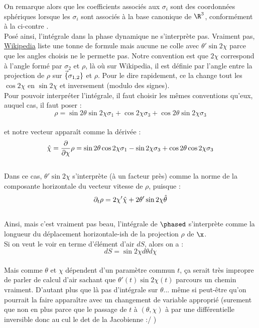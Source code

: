 On remarque alors que les coefficients associés aux $\sigma_i$ sont des coordonnées sphériques lorsque les $\sigma_i$ sont associés à la base canonique de $\R^3$, conformément à la  ci-contre .
\\
Posé ainsi, l'intégrale dans la phase dynamique ne s'interprète pas. Vraiment pas, \href{https://en.wikipedia.org/wiki/Spherical_coordinate_system#Integration_and_differentiation_in_spherical_coordinates}{Wikipedia} liste une tonne de formule mais aucune ne colle avec $\theta'\sin2\chi$ parce que les angles choisis ne le permette pas. 
Notre convention est que $2\chi$ correspond à l'angle formé par $\sigma_2$ et $\rho$, là où sur Wikipedia, il est définie par l'angle entre la projection de $\rho$ sur $\Vec\{\sigma_{1,2}\}$ et $\rho$. Pour le dire rapidement, ce la change tout les $\cos 2\chi$ en $\sin 2\chi$ et inversement (modulo des signes).
\\
Pour pouvoir interpréter l'intégrale, il faut choisir les mêmes conventions qu'eux, auquel cas, il faut poser :
\[\rho = \sin2\theta\sin2\chi \sigma_1 + \cos 2\chi \sigma_3 + \cos2\theta \sin2\chi \sigma_3\]
\\
et notre vecteur apparaît comme la dérivée :
\[\hat{\bf{\chi}} = \frac{\partial}{\partial\chi} \rho = \sin2\theta\cos2\chi \sigma_1 - \sin 2\chi \sigma_3 + \cos2\theta \cos2\chi \sigma_3\]
\\
Dans ce cas, $\theta'\sin2\chi$ s'interprète (à un facteur près) comme la norme de la composante horizontale du vecteur vitesse de $\rho$, puisque :
\[\partial_t\rho = 2 \chi'\hat{\bf{\chi}} + 2 \theta' \sin 2\chi \hat{\bf{\theta}}\]
\\
Ainsi, mais c'est vraiment pas beau, l'intégrale de $\phased$ s'interprète comme la longueur du déplacement horizontale-ish de la projection $\rho$ de $\x$.
\\
Si on veut le voir en terme d'élément d'air $dS$, alors on a :
\[dS = \sin2\chi d\theta d\chi\]
\\
Mais comme $\theta$ et $\chi$ dépendent d'un paramètre commun $t$, ça serait très impropre de parler de calcul d'air sachant que $\theta'(t)\sin 2\chi(t)$ parcours un chemin vraiment. D'autant plus que là pas d'intégrale sur $\theta$... même si peut-être qu'on pourrait la faire apparaître avec un changement de variable approprié (surement que non en plus parce que le passage de $t$ à $(\theta,\chi)$ à par une différentielle inversible donc au cul le det de la Jacobienne :/ )

